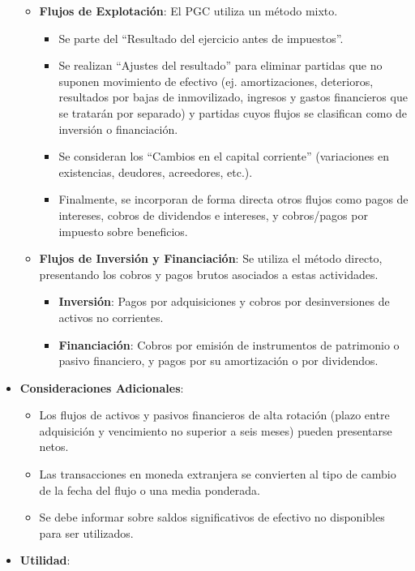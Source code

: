 \documentclass[
  paper=a4,
  ,captions=tableheading
]{scrbook}
\providecommand{\tightlist}{%
  \setlength{\itemsep}{0pt}\setlength{\parskip}{0pt}}
\begin{document}
\begin{itemize}
  \begin{itemize}
  \tightlist
  \item
    \textbf{Flujos de Explotación}: El PGC utiliza un método mixto.

    \begin{itemize}
    \tightlist
    \item
      Se parte del ``Resultado del ejercicio antes de impuestos''.
    \item
      Se realizan ``Ajustes del resultado'' para eliminar partidas que
      no suponen movimiento de efectivo (ej. amortizaciones, deterioros,
      resultados por bajas de inmovilizado, ingresos y gastos
      financieros que se tratarán por separado) y partidas cuyos flujos
      se clasifican como de inversión o financiación.
    \item
      Se consideran los ``Cambios en el capital corriente'' (variaciones
      en existencias, deudores, acreedores, etc.).
    \item
      Finalmente, se incorporan de forma directa otros flujos como pagos
      de intereses, cobros de dividendos e intereses, y cobros/pagos por
      impuesto sobre beneficios.
    \end{itemize}
  \item
    \textbf{Flujos de Inversión y Financiación}: Se utiliza el método
    directo, presentando los cobros y pagos brutos asociados a estas
    actividades.

    \begin{itemize}
    \tightlist
    \item
      \textbf{Inversión}: Pagos por adquisiciones y cobros por
      desinversiones de activos no corrientes.
    \item
      \textbf{Financiación}: Cobros por emisión de instrumentos de
      patrimonio o pasivo financiero, y pagos por su amortización o por
      dividendos.
    \end{itemize}
  \end{itemize}
\item
  \textbf{Consideraciones Adicionales}:

  \begin{itemize}
  \tightlist
  \item
    Los flujos de activos y pasivos financieros de alta rotación (plazo
    entre adquisición y vencimiento no superior a seis meses) pueden
    presentarse netos.
  \item
    Las transacciones en moneda extranjera se convierten al tipo de
    cambio de la fecha del flujo o una media ponderada.
  \item
    Se debe informar sobre saldos significativos de efectivo no
    disponibles para ser utilizados.
  \end{itemize}
\item
  \textbf{Utilidad}:


\end{itemize}
\end{document}
